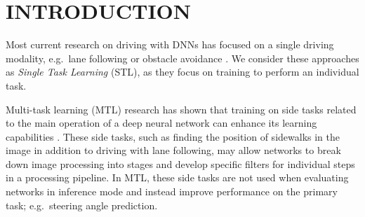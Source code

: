 


\section{INTRODUCTION}
\label{sec:intro}



Most current research on driving with DNNs has focused on a single driving modality, e.g.\ lane following or obstacle avoidance \cite{bojarski2016end,muller2006off,chen2015deepdriving,DBLP:journals/corr/HuvalWTKSPARMCM15}. We consider these approaches as \textit{Single Task Learning} (STL), as they focus on training to perform an individual task.

Multi-task learning (MTL) research has shown that training on side tasks related to the main operation of a deep neural network can enhance its learning capabilities \cite{caruana1998multitask, zhang2012convex}. These side tasks, such as finding the position of sidewalks in the image in addition to driving with lane following, may allow networks to break down image processing into stages and develop specific filters for individual steps in a processing pipeline. In MTL, these side tasks are not used when evaluating networks in inference mode and instead improve performance on the primary task; e.g.\ steering angle prediction.

